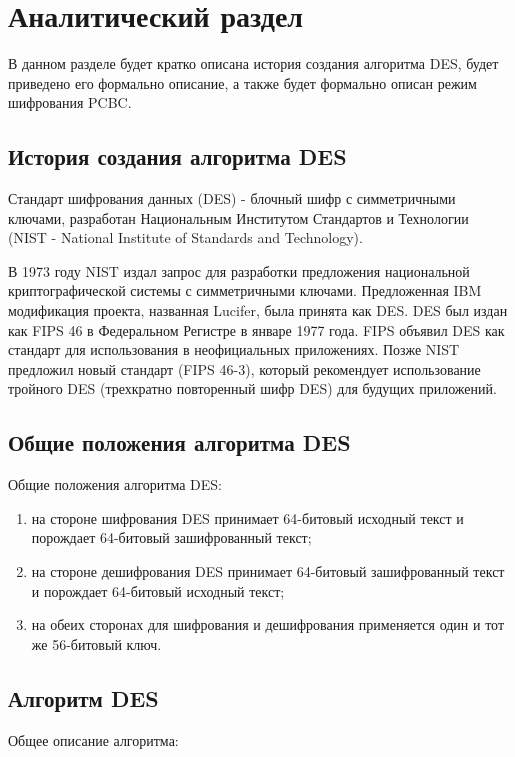 \chapter{Аналитический раздел}

В данном разделе будет кратко описана история создания алгоритма DES, будет приведено его формально описание, а также будет формально описан режим шифрования PCBC.

\section{История создания алгоритма DES}

Стандарт шифрования данных (DES) - блочный шифр с симметричными ключами, разработан Национальным Институтом Стандартов и Технологии (NIST - National Institute
of Standards and Technology).

В 1973 году NIST издал запрос для разработки предложения национальной криптографической системы с симметричными ключами. Предложенная IBM модификация проекта, названная Lucifer, была принята как DES. DES был издан как FIPS 46 в Федеральном Регистре в январе 1977 года.
FIPS объявил DES как стандарт для использования в неофициальных приложениях. Позже NIST предложил новый стандарт (FIPS 46-3), который рекомендует использование тройного DES (трехкратно повторенный шифр DES) для будущих приложений.

\section{Общие положения алгоритма DES}

Общие положения алгоритма DES:

\begin{enumerate}
	\item на стороне шифрования DES принимает 64-битовый исходный текст и порождает
	64-битовый зашифрованный текст;
	\item на стороне дешифрования DES принимает 64-битовый зашифрованный текст и порождает 64-битовый исходный текст;
	\item на обеих сторонах для шифрования и дешифрования применяется один и тот же
	56-битовый ключ.
\end{enumerate}

\section{Алгоритм DES}

Общее описание алгоритма:

